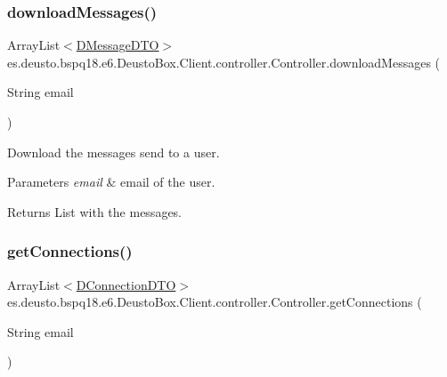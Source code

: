 \subsubsection{\texorpdfstring{download\+Messages()}{downloadMessages()}}
{\footnotesize\ttfamily Array\+List$<$\mbox{\hyperlink{classes_1_1deusto_1_1bspq18_1_1e6_1_1_deusto_box_1_1_server_1_1dto_1_1_d_message_d_t_o}{D\+Message\+D\+TO}}$>$ es.\+deusto.\+bspq18.\+e6.\+Deusto\+Box.\+Client.\+controller.\+Controller.\+download\+Messages (\begin{DoxyParamCaption}\item[{String}]{email }\end{DoxyParamCaption})}

Download the messages send to a user. 
\begin{DoxyParams}{Parameters}
{\em email} & email of the user. \\
\hline
\end{DoxyParams}
\begin{DoxyReturn}{Returns}
List with the messages. 
\end{DoxyReturn}
\mbox{\label{classes_1_1deusto_1_1bspq18_1_1e6_1_1_deusto_box_1_1_client_1_1controller_1_1_controller_a00b07e74b392861bf33230cd9c2743b3}} 
\subsubsection{\texorpdfstring{get\+Connections()}{getConnections()}}
{\footnotesize\ttfamily Array\+List$<$\mbox{\hyperlink{classes_1_1deusto_1_1bspq18_1_1e6_1_1_deusto_box_1_1_server_1_1dto_1_1_d_connection_d_t_o}{D\+Connection\+D\+TO}}$>$ es.\+deusto.\+bspq18.\+e6.\+Deusto\+Box.\+Client.\+controller.\+Controller.\+get\+Connections (\begin{DoxyParamCaption}\item[{String}]{email }\end{DoxyParamCaption})}


